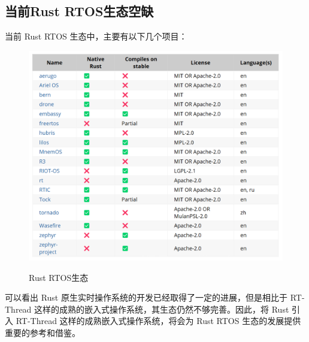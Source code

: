 \subsection{当前Rust RTOS生态空缺}
当前 Rust RTOS 生态中，主要有以下几个项目：
\begin{figure}[htpb]
    \centering
    \caption{Rust RTOS生态\cite{AreWeRTOSYet}}
    \includegraphics[width=0.5\linewidth]{img/Rust RTOS.png}
    \label{fig2}
\end{figure}

可以看出 Rust 原生实时操作系统的开发已经取得了一定的进展，但是相比于 RT-Thread 这样的成熟的嵌入式操作系统，其生态仍然不够完善。因此，将 Rust 引入 RT-Thread 这样的成熟嵌入式操作系统，将会为 Rust RTOS 生态的发展提供重要的参考和借鉴。